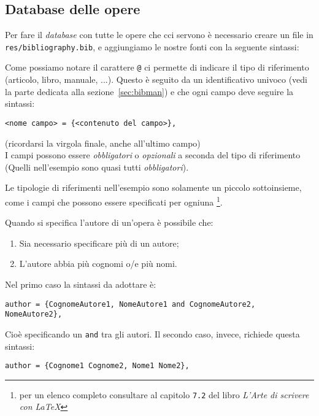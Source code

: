 \subsection{Database delle opere}
Per fare il \textit{database} con tutte le opere che cci servono è necessario
creare un file in \texttt{res/bibliography.bib}, e aggiungiamo le nostre fonti
con la seguente sintassi:

Come possiamo notare il carattere \verb!@! ci permette di indicare il tipo di
riferimento (articolo, libro, manuale, ...). Questo è seguito da un
identificativo univoco (vedi la parte dedicata alla sezione~\ref{sec:bibman})
e che ogni campo deve seguire la sintassi:
\begin{lstlisting}
<nome campo> = {<contenuto del campo>},
\end{lstlisting}
(ricordarsi la virgola finale, anche all'ultimo campo)\\
I campi possono essere \emph{obbligatori} o \emph{opzionali} a seconda del
tipo di riferimento (Quelli nell'esempio sono quasi tutti \emph{obbligatori}).
\par Le tipologie di riferimenti nell'esempio sono solamente un piccolo
sottoinsieme, come i campi che possono essere specificati per ogniuna
\footnote{per un elenco completo consultare al capitolo \texttt{7.2} del libro
\textit{L'Arte di scrivere con \LaTeX{}}}.
\par Quando si specifica l'autore di un'opera è possibile che:
\begin{enumerate}
    \item Sia necessario specificare più di un autore;
    \item L'autore abbia più cognomi o/e più nomi.
\end{enumerate}
Nel primo caso la sintassi da adottare è:
\begin{lstlisting}
author = {CognomeAutore1, NomeAutore1 and CognomeAutore2, NomeAutore2},
\end{lstlisting}
Cioè specificando un \texttt{and} tra gli autori. Il secondo caso, invece,
richiede questa sintassi:
\begin{lstlisting}
author = {Cognome1 Cognome2, Nome1 Nome2},
\end{lstlisting}

